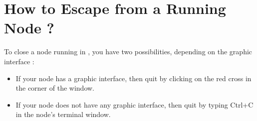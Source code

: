 \newpage

\section{How to Escape from a Running Node ?}
To close a node running in \ros, you have two possibilities, depending on the graphic interface :
\begin{itemize}
	\item If your node has a graphic interface, then quit by clicking on the red cross in the corner of the window.
	\item If your node does not have any graphic interface, then quit by typing Ctrl+C in the node's terminal window.
\end{itemize}